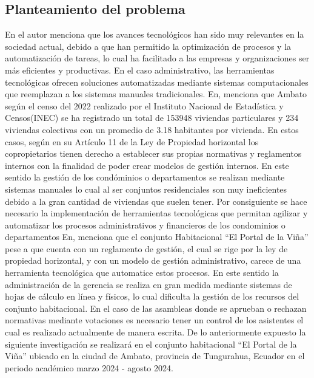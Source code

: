 \subsection{Planteamiento del problema}\label{subsec:planteamiento-del-problema}
En\cite{MoranSalazar} el autor menciona que los avances tecnológicos han sido muy relevantes en la sociedad actual, debido a que han permitido la optimización de procesos y la automatización de tareas, lo cual ha facilitado a las empresas y organizaciones ser más eficientes y productivas.
En el caso administrativo, las herramientas tecnológicas ofrecen soluciones automatizadas mediante sistemas computacionales que reemplazan a los sistemas manuales tradicionales.
\bigbreak
En\cite{INEC}, menciona que Ambato según el censo del 2022 realizado por el Instituto Nacional de Estadística y Censos(INEC) se ha registrado un total de 153948 viviendas particulares y 234 viviendas colectivas con un promedio de 3.18 habitantes por vivienda.
En estos casos, según\cite{Propiedad_Horizontal} en su Artículo 11 de la Ley de Propiedad horizontal los copropietarios tienen derecho a establecer sus propias normativas y reglamentos internos con la finalidad de poder crear modelos de gestión internos.
En este sentido la gestión de los condóminios o departamentos se realizan mediante sistemas manuales lo cual al ser conjuntos residenciales son muy ineficientes debido a la gran cantidad de viviendas que suelen tener.
Por consiguiente se hace necesario la implementación de herramientas tecnológicas que permitan agilizar y automatizar los procesos administrativos y financieros de los condominios o departamentos
\bigbreak
En\cite{FajardoFlores}, menciona que el conjunto Habitacional {\textquotedblleft}El Portal de la Viña{\textquotedblright} pese a que cuenta con un reglamento de gestión, el cual se rige por la ley de propiedad horizontal, y con un modelo de gestión administrativo, carece de una herramienta tecnológica que automatice estos procesos.
En este sentido la administración de la gerencia se realiza en gran medida mediante sistemas de hojas de cálculo en línea y físicos, lo cual dificulta la gestión de los recursos del conjunto habitacional.
En el caso de las asambleas donde se aprueban o rechazan normativas mediante votaciones es necesario tener un control de los asistentes el cual es realizado actualmente de manera escrita.
\bigbreak
De lo anteriormente expuesto la siguiente investigación se realizará en el conjunto habitacional {\textquotedblleft}El Portal de la Viña{\textquotedblright} ubicado en la ciudad de Ambato, provincia de Tungurahua, Ecuador en el periodo académico marzo 2024 - agosto 2024.